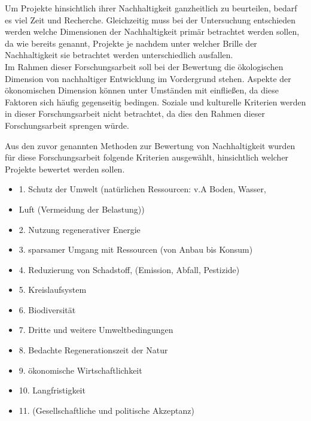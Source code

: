 \documentclass{scrartcl}
\begin{document}
Um Projekte hinsichtlich ihrer Nachhaltigkeit ganzheitlich zu beurteilen, bedarf es viel Zeit und Recherche. Gleichzeitig muss bei der Untersuchung entschieden werden welche Dimensionen der Nachhaltigkeit primär betrachtet werden sollen, da wie bereits genannt, Projekte je nachdem unter welcher Brille der Nachhaltigkeit sie betrachtet werden unterschiedlich ausfallen.
\\
Im Rahmen dieser Forschungsarbeit soll bei der Bewertung die ökologischen Dimension von nachhaltiger Entwicklung im Vordergrund stehen. Aspekte der ökonomischen Dimension können unter Umständen mit einfließen, da diese Faktoren sich häufig gegenseitig bedingen. Soziale und kulturelle Kriterien werden in dieser Forschungsarbeit nicht betrachtet, da dies den Rahmen dieser Forschungsarbeit sprengen würde.

Aus den zuvor genannten Methoden zur Bewertung von Nachhaltigkeit wurden für diese Forschungsarbeit folgende Kriterien ausgewählt, hinsichtlich welcher Projekte bewertet werden sollen.

\begin{itemize}

\item 1. Schutz der Umwelt (natürlichen Ressourcen: v.A Boden, Wasser, \item Luft (Vermeidung der Belastung))
\item 2. Nutzung regenerativer Energie
\item 3. sparsamer Umgang mit Ressourcen (von Anbau bis Konsum)
\item 4. Reduzierung von Schadstoff, (Emission, Abfall, Pestizide)
\item 5. Kreislaufsystem
\item 6. Biodiversität
\item 7. Dritte und weitere Umweltbedingungen
\item 8. Bedachte Regenerationszeit der Natur
\item 9. ökonomische Wirtschaftlichkeit
\item 10. Langfristigkeit
\item 11. (Gesellschaftliche und politische Akzeptanz)
\end{itemize}
\end{document}
